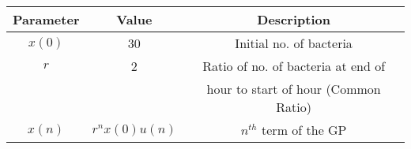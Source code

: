 \begin{tabular}{ | c | c | c | }
    \hline
    Parameter & Value & Description \\
    \hline
    $x(0)$ & 30 & Initial no. of bacteria\\
    \hline
    $r$ & 2 & Ratio of no. of bacteria at end of \\
    & & hour to start of hour (Common Ratio) \\
    \hline
    $x(n)$ & $r^nx(0)u(n)$ & $n^{th}$ term of the GP \\
    \hline
\end{tabular}